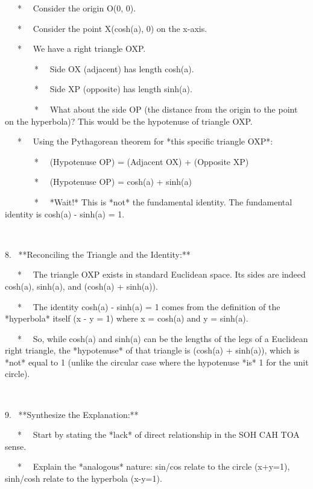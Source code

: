 \documentclass{article}
\newcommand{\nonconverted}[1]{\mbox{}}
\begin{document}
{\ \ \ * \ \ Consider the origin O(0, 0).

\ \ \ * \ \ Consider the point X(cosh(a), 0) on the x-axis.

\ \ \ * \ \ We have a right triangle OXP.

\ \ \ \ \ \ \ * \ \ Side OX (adjacent) has length cosh(a).

\ \ \ \ \ \ \ * \ \ Side XP (opposite) has length sinh(a).

\ \ \ \ \ \ \ * \ \ What about the side OP (the distance from the origin to
the point on the hyperbola)? This would be the hypotenuse of triangle OXP.

\ \ \ * \ \ Using the Pythagorean theorem for *this specific triangle OXP*:

\ \ \ \ \ \ \ * \ \ (Hypotenuse OP){\texttwosuperior} = (Adjacent
OX){\texttwosuperior} + (Opposite XP){\texttwosuperior}

\ \ \ \ \ \ \ * \ \ (Hypotenuse OP){\texttwosuperior} =
cosh{\texttwosuperior}(a) + sinh{\texttwosuperior}(a)

\ \ \ \ \ \ \ * \ \ *Wait!* This is *not* the fundamental identity. The
fundamental identity is cosh{\texttwosuperior}(a) - sinh{\texttwosuperior}(a)
= 1.

\

8. \ **Reconciling the Triangle and the Identity:**

\ \ \ * \ \ The triangle OXP exists in standard Euclidean space. Its sides
are indeed cosh(a), sinh(a), and  \nonconverted{sqrt}
(cosh{\texttwosuperior}(a) + sinh{\texttwosuperior}(a)).

\ \ \ * \ \ The identity cosh{\texttwosuperior}(a) -
sinh{\texttwosuperior}(a) = 1 comes from the definition of the *hyperbola*
itself (x{\texttwosuperior} - y{\texttwosuperior} = 1) where x = cosh(a) and y
= sinh(a).

\ \ \ * \ \ So, while cosh(a) and sinh(a) can be the lengths of the legs of a
Euclidean right triangle, the *hypotenuse* of that triangle is 
\nonconverted{sqrt} (cosh{\texttwosuperior}(a) + sinh{\texttwosuperior}(a)),
which is *not* equal to 1 (unlike the circular case where the hypotenuse *is*
1 for the unit circle).

\

9. \ **Synthesize the Explanation:**

\ \ \ * \ \ Start by stating the *lack* of direct relationship in the SOH CAH
TOA sense.

\ \ \ * \ \ Explain the *analogous* nature: sin/cos relate to the circle
(x{\texttwosuperior}+y{\texttwosuperior}=1), sinh/cosh relate to the hyperbola
(x{\texttwosuperior}-y{\texttwosuperior}=1).

}
\end{document}
